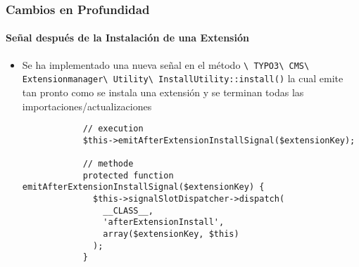 \begin{frame}[fragile]
	\frametitle{Cambios en Profundidad}
	\framesubtitle{Señal después de la Instalación de una Extensión}

	\lstset{basicstyle=\tiny\ttfamily}

	\begin{itemize}

		\item Se ha implementado una nueva señal en el método
			\smaller
				\texttt{\textbackslash
					TYPO3\textbackslash
					CMS\textbackslash
					Extensionmanager\textbackslash
					Utility\textbackslash
					InstallUtility::install()}
			\normalsize
			la cual emite tan pronto como se instala una extensión
			y se terminan todas las importaciones/actualizaciones

		\begin{lstlisting}
			// execution
			$this->emitAfterExtensionInstallSignal($extensionKey);

			// methode
			protected function emitAfterExtensionInstallSignal($extensionKey) {
			  $this->signalSlotDispatcher->dispatch(
			    __CLASS__,
			    'afterExtensionInstall',
			    array($extensionKey, $this)
			  );
			}
		\end{lstlisting}

	\end{itemize}

\end{frame}

